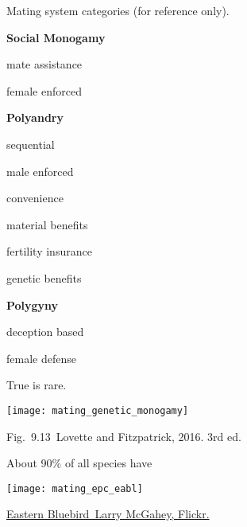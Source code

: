 \documentclass[t]{beamer}
\newcommand{\cornell}[1]{Fig.~#1~Lovette and Fitzpatrick, 2016. 3rd ed.}
\newcommand{\backskip}{\vspace{-0.5\baselineskip}}
\begin{document}
\begin{frame}[t]{Mating system categories (for reference only).}

{\raggedbottom
\begin{multicols}{3}

\textbf{Social Monogamy}

\vspace{0.5\baselineskip}


mate assistance

female enforced

\columnbreak

\textbf{Polyandry}

\vspace{0.5\baselineskip}

sequential 

male enforced

convenience

material benefits

fertility insurance

genetic benefits

\columnbreak

\textbf{Polygyny}

\vspace{0.5\baselineskip}

deception based

female defense



\end{multicols}}

\end{frame}


\begin{frame}[t]{True  is rare.}
\vspace{-0.5\baselineskip}
\centering

\texttt{[image: mating\_genetic\_monogamy]}

\vfilll
\tinyfill \cornell{9.13}
\end{frame}


\begin{frame}[t]{About 90\% of all species have }

\backskip

\texttt{[image: mating\_epc\_eabl]}

\vfilll

\tinyfill \href{https://www.flickr.com/photos/bugbait/7973909138}{Eastern Bluebird \textcopyright\,Larry McGahey, Flickr.}

\end{frame}
\end{document}
